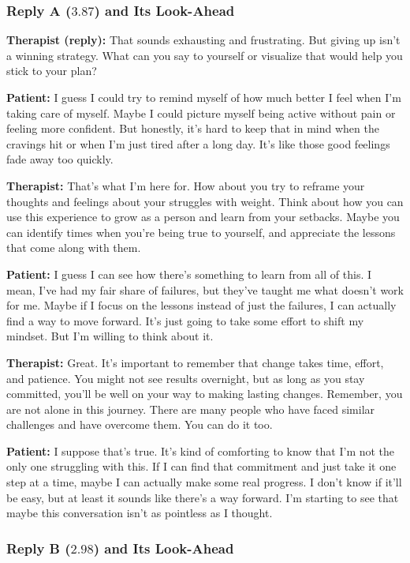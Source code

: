 \subsubsection*{Reply A ($3.87$) and Its Look-Ahead}

\noindent\textbf{Therapist (reply):} That sounds exhausting and frustrating. But giving up isn't a winning strategy. What can you say to yourself or visualize that would help you stick to your plan?

\noindent\textbf{Patient:} I guess I could try to remind myself of how much better I feel when I'm taking care of myself. Maybe I could picture myself being active without pain or feeling more confident. But honestly, it's hard to keep that in mind when the cravings hit or when I'm just tired after a long day. It's like those good feelings fade away too quickly.

\noindent\textbf{Therapist:} That's what I'm here for. How about you try to reframe your thoughts and feelings about your struggles with weight. Think about how you can use this experience to grow as a person and learn from your setbacks. Maybe you can identify times when you're being true to yourself, and appreciate the lessons that come along with them.

\noindent\textbf{Patient:} I guess I can see how there's something to learn from all of this. I mean, I've had my fair share of failures, but they've taught me what doesn't work for me. Maybe if I focus on the lessons instead of just the failures, I can actually find a way to move forward. It's just going to take some effort to shift my mindset. But I'm willing to think about it.

\noindent\textbf{Therapist:} Great. It's important to remember that change takes time, effort, and patience. You might not see results overnight, but as long as you stay committed, you'll be well on your way to making lasting changes. Remember, you are not alone in this journey. There are many people who have faced similar challenges and have overcome them. You can do it too.

\noindent\textbf{Patient:} I suppose that's true. It's kind of comforting to know that I'm not the only one struggling with this. If I can find that commitment and just take it one step at a time, maybe I can actually make some real progress. I don't know if it'll be easy, but at least it sounds like there's a way forward. I'm starting to see that maybe this conversation isn't as pointless as I thought.

\subsubsection*{Reply B ($2.98$) and Its Look-Ahead}


